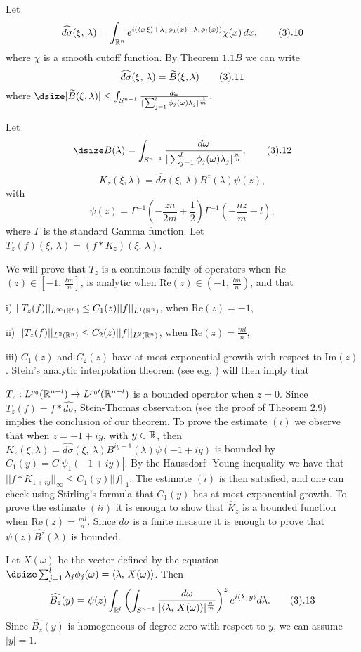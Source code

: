  Let
$$
\widehat{d\sigma}(\xi,\,\lambda) =
\int_{{\Bbb R}^n} e^{i(
\langle x\,\xi\rangle+ \lambda_1\phi_1(x)+\lambda_l\phi_l(x))}
\chi(x)\,dx,
\tag 3.10
$$
where $\chi$ is a smooth cutoff function.
By Theorem $1.1B$  we can write
$$
\widehat{d\sigma}(\xi,\,\lambda) = \widetilde{B}(\xi,\lambda)
\tag 3.11
$$
where $\dsize |\widetilde{B}(\xi,\lambda)|\leq \int_{S^{n-1}} \frac
{d\omega}{|\sum_{j=1}^{l} \phi_j(\omega)\lambda_j|^{\frac n m}}
$. 

Let 
$$
\dsize B(\lambda) =\int_{S^{n-1}} \frac
{d\omega}{|\sum_{j=1}^{l}\phi_j(\omega)\lambda_j|^{\frac n m}}, 
\tag 3.12
$$  
$$
K_z(\xi,\lambda)=
\widehat{d\sigma}(\xi,\,\lambda)  {B}^{z}(\lambda)
\psi(z),
$$
with 
$$
\psi(z) = \Gamma^{-1}(-\frac{zn}{2m}+\frac{1}{2}) 
\Gamma^{-1}(-\frac{nz}{m}+l),
$$
where $\Gamma$ is the standard Gamma function.
Let $T_z(f)(\xi,\,\lambda)= (f*K_z)(\xi,\,\lambda)$.

We will prove that $T_z$ is a continous family of operators when 
Re$(z) \in [-1,\,\frac{lm}{n}]$, is analytic  
when Re$(z) \in (-1,\,\frac{lm}{n})$,
and that
\bigskip
\item{i)}
$||T_z(f)||_{L^\infty({\Bbb R}^n)} \leq C_1(z)||f||_{L^1({\Bbb R}^n)} $, 
when Re$(z) = -1$,
\item{ii)}
$||T_z(f)||_{L^2({\Bbb R}^n)} \leq C_2(z)||f||_{L^2({\Bbb R}^n)}$, when 
Re$(z)=\frac{ml}{n}$,
 \item{iii)}
$C_1(z)$ and $C_2(z)$ have at most exponential growth with respect to Im$(z)$. 
\bigskip
\noindent
Stein's analytic
interpolation theorem (see e.g. \cite{So})  will then imply  that 
\par
\noindent
$T_z : L^{p_0}({\Bbb R}^{n+l})\to L^{p_0\prime}({\Bbb R}^{n+l})$ 
is a bounded operator  when  $z=0$. 
Since $T_z(f)= f*\widehat{d\sigma}$, Stein-Thomas observation 
(see the proof of Theorem 2.9) implies the conclusion of our theorem.
\bigskip
To prove the estimate $(i)$  
we observe that when $z =-1+ iy$, with $y\in {\Bbb R}$, then   
\newline $K_z(\xi,\lambda)=
\widehat{d\sigma}(\xi,\,\lambda)   
{B}^{iy -1}(\lambda) \psi(-1+iy)$  
is bounded by 
$C_1(y)= C|\psi_1(-1+iy)|$.
By the Haussdorf -Young inequality we have that 
$||f*K_{1+iy}||_{\infty}\leq C_1(y)||f||_{1}$. 
The estimate $ (i)$  is then  satisfied, and one can 
check using Stirling's formula that $C_1(y)$ has at most exponential growth.
\medskip
To prove the estimate $(ii)$ it is enough to show that $\widehat K_z$ is a
bounded function  when Re$(z)=\frac{ml}{n}$. 
Since $d\sigma$ is a finite measure 
it is enough to prove that $\psi(z)\widehat{{B}^{z}}(\lambda)$ is bounded.
\par
Let $X(\omega)$ be the vector defined by the equation $\dsize 
\sum_{j=1}^{l}\lambda_j\phi_j(\omega) =\langle \lambda,\, X(\omega)\rangle$.
Then
$$
\widehat{B_z}(y)=\psi(z)\int_{ {\Bbb R}^l} \left(
\int_{S^{n-1}}\frac{d\omega}{|\langle \lambda,\, X(\omega)\rangle|^
{\frac{n}{m}}}
\right)^{z} e^{i\langle \lambda,\, y \rangle} d\lambda.
\tag 3.13
$$
Since $\widehat{B_z}(y)$ is homogeneous of degree zero with respect to $y$,
we can assume  $|y|=1$.

